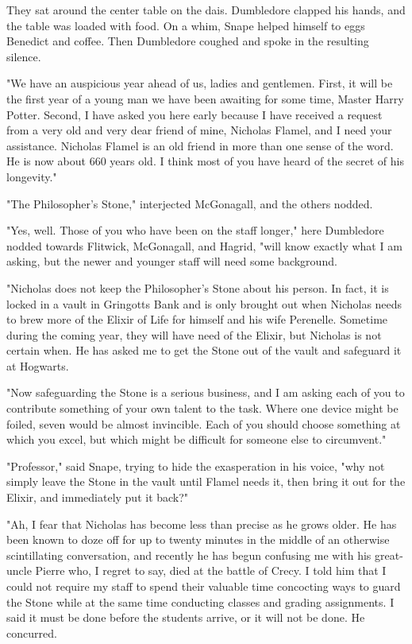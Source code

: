 They sat around the center table on the dais. Dumbledore clapped his hands, and the table was loaded with food. On a whim, Snape helped himself to eggs Benedict and coffee. Then Dumbledore coughed and spoke in the resulting silence.

"We have an auspicious year ahead of us, ladies and gentlemen. First, it will be the first year of a young man we have been awaiting for some time, Master Harry Potter. Second, I have asked you here early because I have received a request from a very old and very dear friend of mine, Nicholas Flamel, and I need your assistance. Nicholas Flamel is an old friend in more than one sense of the word. He is now about 660 years old. I think most of you have heard of the secret of his longevity."

"The Philosopher's Stone," interjected McGonagall, and the others nodded.

"Yes, well. Those of you who have been on the staff longer," here Dumbledore nodded towards Flitwick, McGonagall, and Hagrid, "will know exactly what I am asking, but the newer and younger staff will need some background.

"Nicholas does not keep the Philosopher's Stone about his person. In fact, it is locked in a vault in Gringotts Bank and is only brought out when Nicholas needs to brew more of the Elixir of Life for himself and his wife Perenelle. Sometime during the coming year, they will have need of the Elixir, but Nicholas is not certain when. He has asked me to get the Stone out of the vault and safeguard it at Hogwarts.

"Now safeguarding the Stone is a serious business, and I am asking each of you to contribute something of your own talent to the task. Where one device might be foiled, seven would be almost invincible. Each of you should choose something at which you excel, but which might be difficult for someone else to circumvent."

"Professor," said Snape, trying to hide the exasperation in his voice, "why not simply leave the Stone in the vault until Flamel needs it, then bring it out for the Elixir, and immediately put it back?"

"Ah, I fear that Nicholas has become less than precise as he grows older. He has been known to doze off for up to twenty minutes in the middle of an otherwise scintillating conversation, and recently he has begun confusing me with his great-uncle Pierre who, I regret to say, died at the battle of Crecy. I told him that I could not require my staff to spend their valuable time concocting ways to guard the Stone while at the same time conducting classes and grading assignments. I said it must be done before the students arrive, or it will not be done. He concurred.

